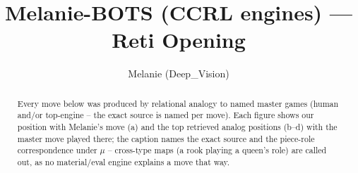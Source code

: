 \documentclass[11pt]{article}
\title{Melanie-BOTS (CCRL engines) — Reti Opening}
\author{Melanie (Deep\_Vision)}
\date{}
\begin{document}
\maketitle

\begin{abstract}Every move below was produced by relational analogy to named master games (human and/or top-engine -- the exact source is named per move). Each figure shows our position with Melanie's move (a) and the top retrieved analog positions (b--d) with the master move played there; the caption names the exact source and the piece-role correspondence under $\mu$ -- cross-type maps (a rook playing a queen's role) are called out, as no material/eval engine explains a move that way.\end{abstract}

\begin{figure}[p]\centering
\begin{subfigure}{0.46\textwidth}\centering
\resizebox{\linewidth}{!}{%
\newchessgame
\chessboard[
  setfen={rnbq1rk1/pp2bppp/4pn2/2pp4/2P5/1P3NP1/P2PPPBP/RNBQ1RK1 w - - 0 7},
  showmover=false,
  pgfstyle=straightmove, color=movearrow, markmove={g2-h3}
]}
\caption{}
\end{subfigure}\hfill
\begin{subfigure}{0.46\textwidth}\centering
\resizebox{\linewidth}{!}{%
\newchessgame
\chessboard[
  setfen={rnbq1rk1/pp2bppp/4pn2/2pp4/2P5/1P3NP1/P2PPPBP/RNBQ1RK1 w - - 0 7},
  showmover=false,
  pgfstyle=straightmove, color=movearrow, markmove={c1-b2}
]}
\caption{}
\end{subfigure}
\\[4pt]
\begin{subfigure}{0.46\textwidth}\centering
\resizebox{\linewidth}{!}{%
\newchessgame
\chessboard[
  setfen={rnbq1rk1/pp2bppp/4pn2/2pp4/2P5/1P3NP1/P2PPPBP/RNBQ1RK1 w - - 0 7},
  showmover=false,
  pgfstyle=straightmove, color=movearrow, markmove={c1-b2}
]}
\caption{}
\end{subfigure}\hfill
\begin{subfigure}{0.46\textwidth}\centering
\resizebox{\linewidth}{!}{%
\newchessgame
\chessboard[
  setfen={rnbq1rk1/pp2bppp/4pn2/2pp4/2P5/1P3NP1/P2PPPBP/RNBQ1RK1 w - - 0 7},
  showmover=false,
  pgfstyle=straightmove, color=movearrow, markmove={c1-b2}
]}
\caption{}
\end{subfigure}

\end{figure}
\end{document}
